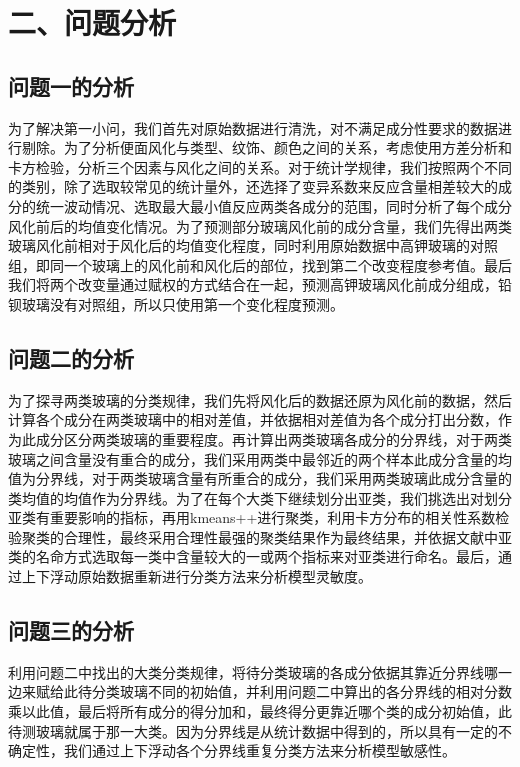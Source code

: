 \documentclass{my_paper}
\begin{document}
\section{二、问题分析}
\subsection{问题一的分析}

为了解决第一小问，我们首先对原始数据进行清洗，对不满足成分性要求的数据进行剔除。为了分析便面风化与类型、纹饰、颜色之间的关系，考虑使用方差分析和卡方检验，分析三个因素与风化之间的关系。对于统计学规律，我们按照两个不同的类别，除了选取较常见的统计量外，还选择了变异系数来反应含量相差较大的成分的统一波动情况、选取最大最小值反应两类各成分的范围，同时分析了每个成分风化前后的均值变化情况。为了预测部分玻璃风化前的成分含量，我们先得出两类玻璃风化前相对于风化后的均值变化程度，同时利用原始数据中高钾玻璃的对照组，即同一个玻璃上的风化前和风化后的部位，找到第二个改变程度参考值。最后我们将两个改变量通过赋权的方式结合在一起，预测高钾玻璃风化前成分组成，铅钡玻璃没有对照组，所以只使用第一个变化程度预测。
\subsection{问题二的分析}

为了探寻两类玻璃的分类规律，我们先将风化后的数据还原为风化前的数据，然后计算各个成分在两类玻璃中的相对差值，并依据相对差值为各个成分打出分数，作为此成分区分两类玻璃的重要程度。再计算出两类玻璃各成分的分界线，对于两类玻璃之间含量没有重合的成分，我们采用两类中最邻近的两个样本此成分含量的均值为分界线，对于两类玻璃含量有所重合的成分，我们采用两类玻璃此成分含量的类均值的均值作为分界线。为了在每个大类下继续划分出亚类，我们挑选出对划分亚类有重要影响的指标，再用kmeans++进行聚类，利用卡方分布的相关性系数检验聚类的合理性，最终采用合理性最强的聚类结果作为最终结果，并依据文献中亚类的名命方式选取每一类中含量较大的一或两个指标来对亚类进行命名。最后，通过上下浮动原始数据重新进行分类方法来分析模型灵敏度。

\subsection{问题三的分析}
利用问题二中找出的大类分类规律，将待分类玻璃的各成分依据其靠近分界线哪一边来赋给此待分类玻璃不同的初始值，并利用问题二中算出的各分界线的相对分数乘以此值，最后将所有成分的得分加和，最终得分更靠近哪个类的成分初始值，此待测玻璃就属于那一大类。因为分界线是从统计数据中得到的，所以具有一定的不确定性，我们通过上下浮动各个分界线重复分类方法来分析模型敏感性。
\end{document}
